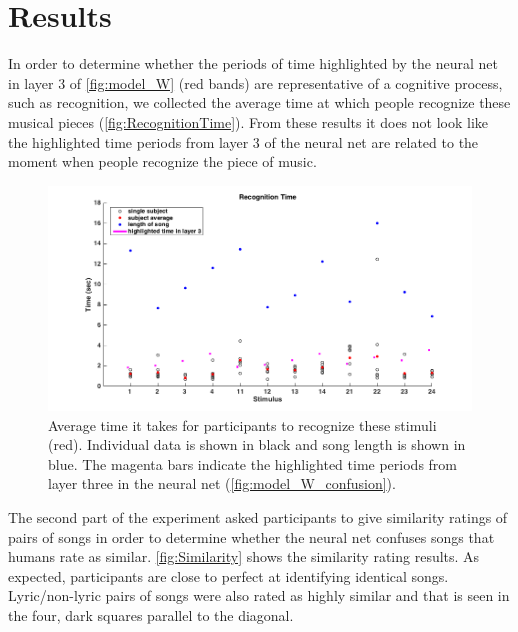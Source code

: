 \section{Results}
In order to determine whether the periods of time highlighted by the neural net in layer 3 of \autoref{fig:model_W} (red bands) are representative of a cognitive process, such as recognition, we collected the average time at which people recognize these musical pieces (\autoref{fig:RecognitionTime}). 
From these results it does not look like the highlighted time periods from layer 3 of the neural net are related to the moment when people recognize the piece of music. 
\begin{figure}[h] 
  \begin{center}
        \includegraphics[scale=0.5]{Figures/RecognitionTimeGraph.png}
    \caption{Average time it takes for participants to recognize these stimuli (red). Individual data is shown in black and song length is shown in blue. The magenta bars indicate the highlighted time periods from layer three in the neural net (\autoref{fig:model_W_confusion}).}
    \label{fig:RecognitionTime}
  \end{center}
\end{figure}

The second part of the experiment asked participants to give similarity ratings of pairs of songs in order to determine whether the neural net confuses songs that humans rate as similar. 
\autoref{fig:Similarity} shows the similarity rating results. 
As expected, participants are close to perfect at identifying identical songs. 
Lyric/non-lyric pairs of songs were also rated as highly similar and that is seen in the four, dark squares parallel to the diagonal.

